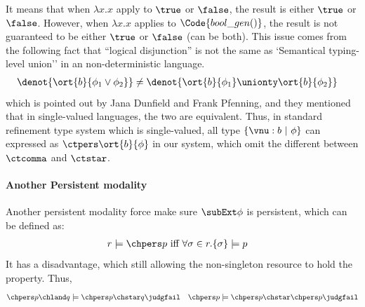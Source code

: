 It means that when $\lambda x.x$ apply to $\true$ or $\false$, the result is either $\true$ or $\false$.  However, when $\lambda x.x$ applies to $\Code{bool\_gen()}$, the result is not guaranteed to be either $\true$ or $\false$ (can be both).
This issue comes from the following fact that ``logical disjunction'' is not the same as `Semantical typing-level union'' in an non-deterministic language.
\begin{align*}
  & \denot{\ort{b}{\phi_1 \lor \phi_2}} \not= \denot{\ort{b}{\phi_1} \unionty \ort{b}{\phi_2}} 
\end{align*}\noindent
which is pointed out by Jana Dunfield and Frank Pfenning\cite{UnionTypeAssignment}, and they mentioned that in single-valued languages, the two are equivalent. Thus, in standard refinement type system which is single-valued, all type $\{\vnu : b ~|~ \phi \}$ can expressed as $\ctpers \ort{b}{\phi}$ in our system, which omit the different between $\ctcomma$ and $\ctstar$.

\paragraph{Another Persistent modality} Another persistent modality force make sure $\subExt \phi$ is persistent, which can be defined as: 
\begin{align*}
  r \models \chpers p &\text{ iff } \forall \sigma \in r. \{\sigma \} \models p
\end{align*}\noindent
It has a disadvantage, which still allowing the non-singleton resource to hold the property. Thus,
\begin{align*}
  &\chpers p \chland q \models \chpers p \chstar q \judgfail
  &\chpers p \models \chpers p \chstar \chpers p \judgfail
\end{align*}\noindent

